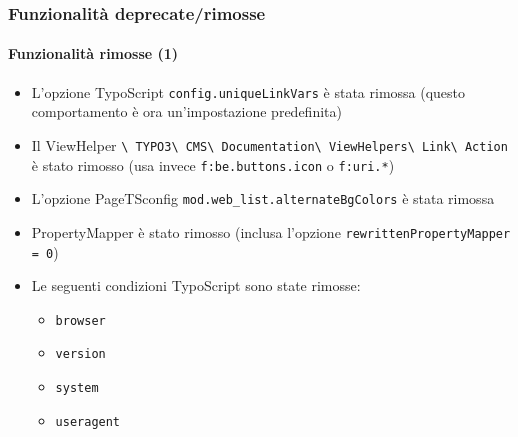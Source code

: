 \begin{frame}[fragile]
	\frametitle{Funzionalità deprecate/rimosse}
	\framesubtitle{Funzionalità rimosse (1)}

	\begin{itemize}

		\item
			\small
				L'opzione TypoScript \texttt{config.uniqueLinkVars} è stata rimossa\newline
				(questo comportamento è ora un'impostazione predefinita)
			\normalsize

		\item
			\small
				Il ViewHelper
					\texttt{\textbackslash
						TYPO3\textbackslash
						CMS\textbackslash
						Documentation\textbackslash
						ViewHelpers\textbackslash
						Link\textbackslash
						Action}
					è stato rimosso (usa invece \texttt{f:be.buttons.icon} o \texttt{f:uri.*})
			\normalsize

		\item
			\small
				L'opzione PageTSconfig \texttt{mod.web\_list.alternateBgColors}\newline
				è stata rimossa
			\normalsize

		\item
			\small
				PropertyMapper è stato rimosso\newline
				(inclusa l'opzione \texttt{rewrittenPropertyMapper = 0})
			\normalsize

		\item
			\small
				Le seguenti condizioni TypoScript sono state rimosse:

					\begin{itemize}
						\item\texttt{browser}
						\item\texttt{version}
						\item\texttt{system}
						\item\texttt{useragent}
					\end{itemize}
			\normalsize

	\end{itemize}

\end{frame}


